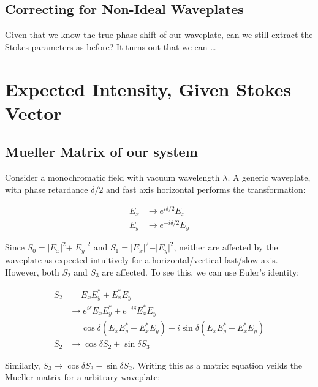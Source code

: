 \documentclass{article}
\begin{document}
\subsection{Correcting for Non-Ideal Waveplates}
Given that we know the true phase shift of our waveplate, can we still extract the Stokes parameters as before? It turns out that we can \ldots

\section{Expected Intensity, Given Stokes Vector}


\subsection{Mueller Matrix of our system}

Consider a monochromatic field with vacuum wavelength $\lambda$. A generic waveplate, with phase retardance $\delta/2$ and fast axis horizontal performs the transformation:

\begin{subequations}
    \begin{align}
        \label{eq:arb_wave_horiz}
        E_x &\rightarrow e^{i\delta/2} E_x \\
        E_y &\rightarrow e^{-i\delta/2} E_y
    \end{align}
\end{subequations}

Since $S_0 = \vert E_x\vert^2 + \vert E_y\vert^2$ and $S_1 = \vert E_x\vert^2 - \vert E_y\vert^2$, neither are affected by the waveplate as expected intuitively for a horizontal/vertical fast/slow axis. However, both $S_2$ and $S_3$ are affected. To see this, we can use Euler's identity:

\begin{align}
    S_2 &= E_xE_y^* + E_x^*E_y \nonumber \\
        &\rightarrow  e^{i\delta}E_xE_y^* + e^{-i\delta}E_x^*E_y \nonumber \\
        &= \cos\delta\left(E_xE_y^* + E_x^*E_y\right) + i\sin\delta\left(E_xE_y^* - E_x^*E_y\right)\nonumber \\
    S_2 &\rightarrow \cos\delta S_2 + \sin\delta S_3 \nonumber
\end{align}

Similarly, $S_3 \rightarrow \cos\delta S_3 - \sin\delta S_2$. Writing this as a matrix equation yeilds the Mueller matrix for a arbitrary waveplate:
\end{document}
